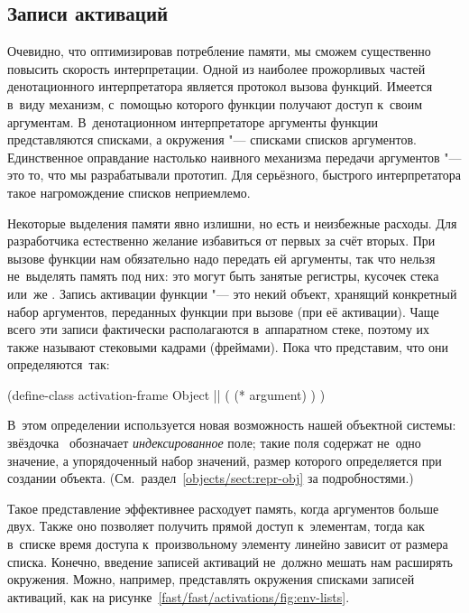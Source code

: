 \subsection{Записи активаций}\label{fast/fast/ssect:activations}

Очевидно, что оптимизировав потребление памяти, мы сможем существенно повысить
скорость интерпретации. Одной из наиболее прожорливых частей денотационного
интерпретатора является протокол вызова функций. Имеется в~виду механизм,
с~помощью которого функции получают доступ к~своим аргументам. В~денотационном
интерпретаторе аргументы функции представляются списками, а окружения "---
списками списков аргументов. Единственное оправдание настолько наивного
механизма передачи аргументов "--- это то, что мы разрабатывали прототип. Для
серьёзного, быстрого интерпретатора такое нагромождение списков неприемлемо.

Некоторые выделения памяти явно излишни, но есть и неизбежные расходы. Для
разработчика естественно желание избавиться от первых за счёт вторых. При вызове
функции нам обязательно надо передать ей аргументы, так что нельзя не~выделять
память под них: это могут быть занятые регистры, кусочек стека или~же
. Запись активации функции "--- это некий объект,
хранящий конкретный набор аргументов, переданных функции при вызове (при её
активации). Чаще всего эти записи фактически располагаются в~аппаратном стеке,
поэтому их также называют стековыми кадрами (фреймами). Пока что представим,
что они определяются~так:

\begin{code:lisp}
(define-class activation-frame Object     ||
  ( (* argument) ) )
\end{code:lisp}

\noindent
В~этом определении используется новая возможность нашей объектной системы:
звёздочка~\ic{*} обозначает \emph{индексированное} поле; такие поля содержат
не~одно значение, а упорядоченный набор значений, размер которого определяется
при создании объекта. (См.~раздел~\ref{objects/sect:repr-obj} за подробностями.)

Такое представление эффективнее расходует память, когда аргументов больше двух.
Также оно позволяет получить прямой доступ к~элементам, тогда как в~списке время
доступа к~произвольному элементу линейно зависит от размера списка. Конечно,
введение записей активаций не~должно мешать нам расширять окружения. Можно,
например, представлять окружения списками записей активаций, как на
рисунке~\ref{fast/fast/activations/fig:env-lists}.

